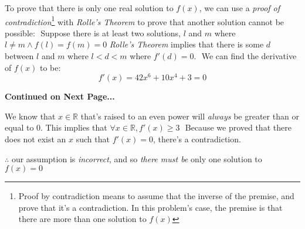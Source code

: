 \documentclass{MathNotes}
\newcommand{\continued}{
\mbox{}
\vfill
\textbf{Continued on Next Page...}\newpage
}
\begin{document}
To prove that there is only one real solution to $f(x)$, we can use a
\textit{proof of contradiction}\footnote{Proof by contradiction means to assume
that the inverse of the premise, and prove that it's a contradiction. In this
problem's case, the premise is that there are more than one solution to $f(x)$}
with \textit{Rolle's Theorem} to prove that
another solution cannot be possible:
\newline$ $\newline
{}
Suppose there is at least two solutions, $l$ and $m$ where 
$l\neq m\land f(l)=f(m)=0$\newline$ $\newline
\textit{Rolle's Theorem} implies that there is some $d$ between $l$ and $m$
where $l<d<m$ where $f'(d)=0$.
\newline$ $\newline
We can find the derivative of $f(x)$ to be:
$$f'(x)=42x^6+10x^4+3=0$$

\continued
{}
We know that $x\in\mathbb{R}$ that's raised to an even power will 
\textit{always} be greater than or equal to 0. This implies that
$\forall x\in\mathbb{R},f'(x)\geq3$
\newline$ $\newline
Because we proved that there does not exist an $x$ such that $f'(x)=0$, there's
a contradiction.

$\therefore$ our assumption is \textit{incorrect}, and so \textit{there must be}
only one solution to $f(x)=0$
\end{document}
